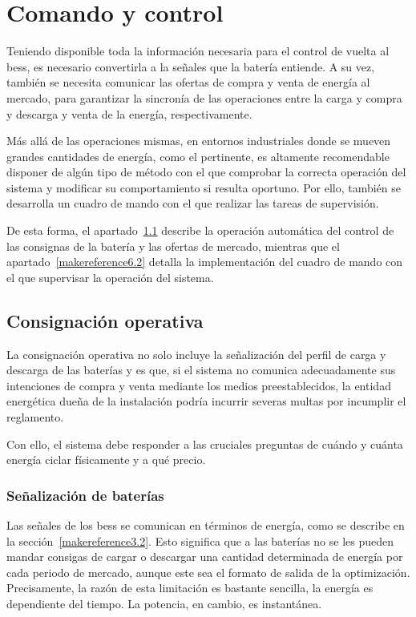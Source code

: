 \cleardoublepage

\chapter{Comando y control}
\label{makereference6}

Teniendo disponible toda la información necesaria para el control de vuelta al \gls{bess}, es necesario convertirla a la señales que la batería entiende. A su vez, también se necesita comunicar las ofertas de compra y venta de energía al mercado, para garantizar la sincronía de las operaciones entre la carga y compra y descarga y venta de la energía, respectivamente.

Más allá de las operaciones mismas, en entornos industriales donde se mueven grandes cantidades de energía, como el pertinente, es altamente recomendable disponer de algún tipo de método con el que comprobar la correcta operación del sistema y modificar su comportamiento si resulta oportuno. Por ello, también se desarrolla un cuadro de mando con el que realizar las tareas de supervisión.

De esta forma, el apartado~\ref{makereference6.1} describe la operación automática del control de las consignas de la batería y las ofertas de mercado, mientras que el apartado~\ref{makereference6.2} detalla la implementación del cuadro de mando con el que supervisar la operación del sistema.

\section{Consignación operativa}
\label{makereference6.1}

La consignación operativa no solo incluye la señalización del perfil de carga y descarga de las baterías y es que, si el sistema no comunica adecuadamente sus intenciones de compra y venta mediante los medios preestablecidos, la entidad energética dueña de la instalación podría incurrir severas multas por incumplir el reglamento.

Con ello, el sistema debe responder a las cruciales preguntas de cuándo y cuánta energía ciclar físicamente y a qué precio.

\subsection{Señalización de baterías}
\label{makereference6.1.1}

Las señales de los \gls{bess} se comunican en términos de energía, como se describe en la sección~\ref{makereference3.2}. Esto significa que a las baterías no se les pueden mandar consigas de cargar o descargar una cantidad determinada de energía por cada periodo de mercado, aunque este sea el formato de salida de la optimización. Precisamente, la razón de esta limitación es bastante sencilla, la energía es dependiente del tiempo. La potencia, en cambio, es instantánea.

